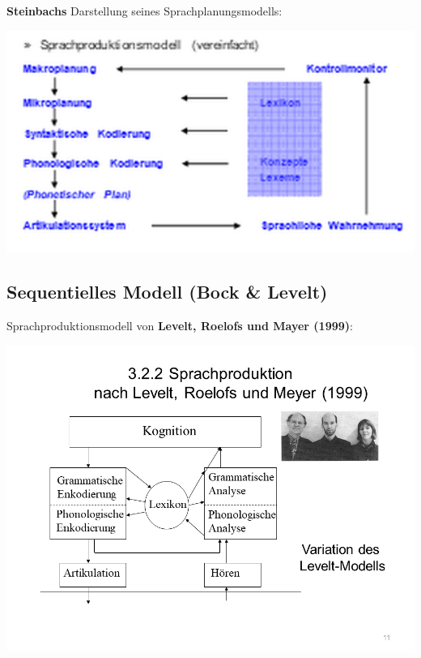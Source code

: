 \documentclass[
  letterpaper,
]{scrbook}
\begin{document}
\textbf{Steinbachs} Darstellung seines Sprachplanungsmodells:

\includegraphics[width=1\textwidth,height=\textheight]{./pictures/Steinbach_8.png}

\hypertarget{sequentielles-modell-bock-levelt}{%
\subsection{Sequentielles Modell (Bock \&
Levelt)}\label{sequentielles-modell-bock-levelt}}

Sprachproduktionsmodell von \textbf{Levelt, Roelofs und Mayer (1999)}:

\includegraphics[width=1\textwidth,height=\textheight]{./pictures/Versprechertypen_11.PNG}
\end{document}
